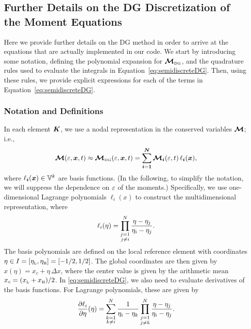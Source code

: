 \documentclass[10pt,preprint]{aastex}
\begin{document}
\subsection{Further Details on the DG Discretization of the Moment Equations}

Here we provide further details on the DG method in order to arrive at the equations that are actually implemented in our code.  
We start by introducing some notation, defining the polynomial expansion for $\boldsymbol{\mathcal{M}}_{\mbox{\tiny DG}}$, and the quadrature rules used to evaluate the integrals in Equation~\eqref{eq:semidiscreteDG}.  
Then, using these rules, we provide explicit expressions for each of the terms in Equation~\eqref{eq:semidiscreteDG}.  

\subsubsection{Notation and Definitions}

In each element $\boldsymbol{K}$, we use a nodal representation in the conserved variables $\boldsymbol{\mathcal{M}}$; i.e.,
\begin{equation}
  \boldsymbol{\mathcal{M}}(\varepsilon,\boldsymbol{x},t)\approx
  \boldsymbol{\mathcal{M}}_{\mbox{\tiny DG}}(\varepsilon,\boldsymbol{x},t)=\sum_{\boldsymbol{i}=\boldsymbol{1}}^{\boldsymbol{N}}\boldsymbol{\mathcal{M}}_{\boldsymbol{i}}(\varepsilon,t)\,\ell_{\boldsymbol{i}}(\boldsymbol{x}),
  \label{eq:conservedNodalExpansion}
\end{equation}
where $\ell_{\boldsymbol{i}}(\boldsymbol{x})\in\mathbb{V}^{k}$ are basis functions.  
(In the following, to simplify the notation, we will suppress the dependence on $\varepsilon$ of the moments.)
Specifically, we use one-dimensional Lagrange polynomials $\ell_{i}(x)$ to construct the multidimensional representation, where
\begin{equation}
  \ell_{i}(\eta)=
  \prod_{\substack{j=1\\j\ne i}}^{N}\frac{\eta-\eta_{j}}{\eta_{i}-\eta_{j}}.  
\end{equation}
The basis polynomials are defined on the local reference element with coordinates $\eta\in I=[\eta_{\mbox{\tiny L}},\eta_{\mbox{\tiny H}}]=[-1/2,1/2]$.  
The global coordinates are then given by $x(\eta)=x_{c}+\eta\,\Delta x$, where the center value is given by the arithmetic mean $x_{c}=(x_{\mbox{\tiny L}}+x_{\mbox{\tiny H}})/2$.  
In \eqref{eq:semidiscreteDG}, we also need to evaluate derivatives of the basis functions.  
For Lagrange polynomials, these are given by
\begin{equation}
  \frac{\partial \ell_{i}}{\partial \eta}(\eta)
  =\sum_{\substack{k = 1 \\ k \ne i}}^{N}\frac{1}{\eta_{i}-\eta_{k}}
  \prod_{\substack{j=1 \\ j \ne k}}^{N}\frac{\eta-\eta_{j}}{\eta_{i}-\eta_{j}}.  
\end{equation}
\end{document}
